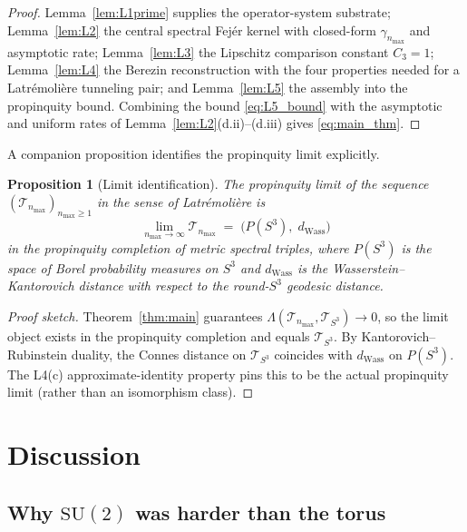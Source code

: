 \documentclass[11pt,a4paper]{article}
\theoremstyle{plain}
\newtheorem{proposition}[theorem]{Proposition}
\theoremstyle{definition}
\newcommand{\nmax}{n_{\max}}
\newcommand{\sthree}{S^{3}}
\newcommand{\Tcal}{\mathcal{T}}
\newcommand{\SU}{\mathrm{SU}}
\begin{document}
\begin{proof}
Lemma~\ref{lem:L1prime} supplies the operator-system substrate;
Lemma~\ref{lem:L2} the central spectral Fej\'er kernel with closed-form
$\gamma_{\nmax}$ and asymptotic rate; Lemma~\ref{lem:L3} the Lipschitz
comparison constant $C_3 = 1$; Lemma~\ref{lem:L4} the Berezin
reconstruction with the four properties needed for a Latr\'emoli\`ere
tunneling pair; and Lemma~\ref{lem:L5} the assembly into the
propinquity bound. Combining the bound \eqref{eq:L5_bound} with the
asymptotic and uniform rates of Lemma~\ref{lem:L2}(d.ii)--(d.iii)
gives \eqref{eq:main_thm}.
\end{proof}

A companion proposition identifies the propinquity limit explicitly.

\begin{proposition}[Limit identification]\label{prop:limit_identification}
The propinquity limit of the sequence $(\Tcal_{\nmax})_{\nmax \ge 1}$
in the sense of Latr\'emoli\`ere is
\begin{equation*}
   \lim_{\nmax \to \infty} \Tcal_{\nmax}
   \;=\; \bigl(P(\sthree),\; d_{\mathrm{Wass}}\bigr)
\end{equation*}
in the propinquity completion of metric spectral triples, where
$P(\sthree)$ is the space of Borel probability measures on $\sthree$
and $d_{\mathrm{Wass}}$ is the Wasserstein--Kantorovich distance with
respect to the round-$\sthree$ geodesic distance.
\end{proposition}

\begin{proof}[Proof sketch]
Theorem~\ref{thm:main} guarantees $\Lambda(\Tcal_{\nmax},
\Tcal_{\sthree}) \to 0$, so the limit object exists in the propinquity
completion and equals $\Tcal_{\sthree}$. By Kantorovich--Rubinstein
duality, the Connes distance on $\Tcal_{\sthree}$ coincides with
$d_{\mathrm{Wass}}$ on $P(\sthree)$. The L4(c) approximate-identity
property pins this to be the actual propinquity limit (rather than an
isomorphism class).
\end{proof}

\section{Discussion}\label{sec:discussion}

\subsection{Why $\SU(2)$ was harder than the torus}\label{sec:why_su2}
\end{document}
